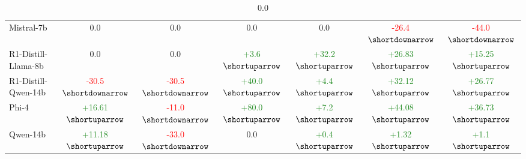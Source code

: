 \begin{table}[H]
\begin{tabular}{lcccccc}
    Mistral-7b                                          & 0.0                   & 0.0                   & 0.0                & 0.0                & \textcolor{red}{-26.4$\shortdownarrow$}              & \textcolor{red}{-44.0$\shortdownarrow$}                \\
    R1-Distill-Llama-8b                                 & 0.0                   & 0.0                   & \textcolor{ForestGreen}{+3.6$\shortuparrow$}                & \textcolor{ForestGreen}{+32.2$\shortuparrow$}                & \textcolor{ForestGreen}{+26.83$\shortuparrow$}              & \textcolor{ForestGreen}{+15.25$\shortuparrow$}                \\
    R1-Distill-Qwen-14b                                 & \textcolor{red}{-30.5$\shortdownarrow$}                   & \textcolor{red}{-30.5$\shortdownarrow$}                   & \textcolor{ForestGreen}{+40.0$\shortuparrow$}                & \textcolor{ForestGreen}{+4.4$\shortuparrow$}                & \textcolor{ForestGreen}{+32.12$\shortuparrow$}              & \textcolor{ForestGreen}{+26.77$\shortuparrow$}                \\
    Phi-4                                               & \textcolor{ForestGreen}{+16.61$\shortuparrow$}                   & \textcolor{red}{-11.0$\shortdownarrow$}                   & \textcolor{ForestGreen}{+80.0$\shortuparrow$}                & \textcolor{ForestGreen}{+7.2$\shortuparrow$}                & \textcolor{ForestGreen}{+44.08$\shortuparrow$}              & \textcolor{ForestGreen}{+36.73$\shortuparrow$}                \\
    Qwen-14b                                            & \textcolor{ForestGreen}{+11.18$\shortuparrow$}                   & \textcolor{red}{-33.0$\shortdownarrow$}                   & 0.0                & \textcolor{ForestGreen}{+0.4$\shortuparrow$}                & \textcolor{ForestGreen}{+1.32$\shortuparrow$}              & \textcolor{ForestGreen}{+1.1$\shortuparrow$}                \\ \hline
    \end{tabular}
    \caption{0.0}
    \label{tab:\textcolor{ForestGreen}{+3.6$\shortuparrow$}}
    \end{table}
    